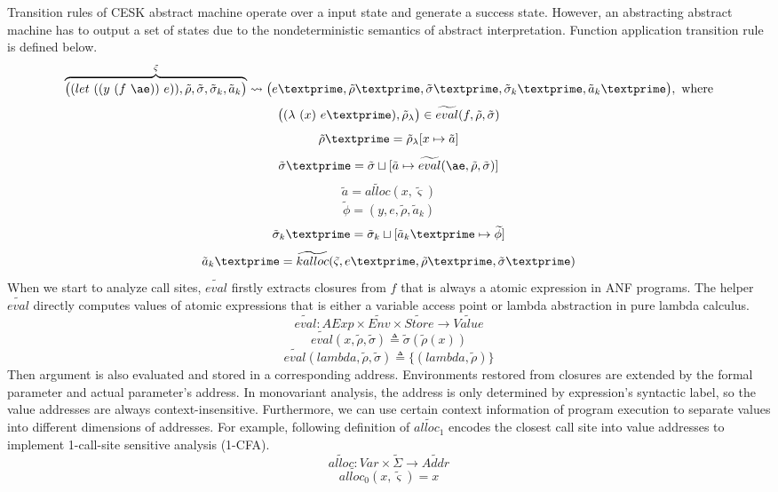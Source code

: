 \documentclass{article}
\begin{document}
Transition rules of CESK abstract machine operate over a input state and generate a success state.
However, an abstracting abstract machine has to output a set of states due to the nondeterministic semantics of abstract interpretation.
Function application transition rule is defined below.
\[
\overbrace{
\big((let\ ((y\ (f\ \ae))\ e)), \tilde{\rho}, \tilde{\sigma}, \tilde{\sigma}_k, \tilde{a}_k \big)
}^{\tilde{\varsigma}}
\leadsto \big(e\textprime,\tilde{\rho}\textprime, \tilde{\sigma}\textprime, \tilde{\sigma}_k\textprime, \tilde{a}_k\textprime \big), \mbox{ where}
\]
\[
\big((\lambda\ (x)\ e\textprime), \tilde{\rho}_{\lambda}  \big) \in \widetilde{eval}(f, \tilde{\rho}, \tilde{\sigma})
\]
\[
\tilde{\rho}\textprime = \tilde{\rho}_{\lambda}[x \mapsto \tilde{a}]
\]
\[
\tilde{\sigma}\textprime = \tilde{\sigma} \sqcup [\tilde{a} \mapsto \widetilde{eval}(\ae, \tilde{\rho}, \tilde{\sigma})]
\]
\[
\tilde{a} = \widetilde{alloc}(x, \tilde{\varsigma})
\]
\[
\widetilde{\phi} = {(y, e, \tilde{\rho}, \tilde{a}_k)}
\]
\[
\tilde{\sigma}_k\textprime = \tilde{\sigma}_k \sqcup [\tilde{a}_k\textprime \mapsto \widetilde{\phi}]
\]
\[
\tilde{a}_k\textprime = \widetilde{kalloc}(\tilde{\varsigma}, e\textprime, \tilde{\rho}\textprime, \tilde{\sigma}\textprime)
\]
When we start to analyze call sites, $\widetilde{eval}$ firstly extracts closures from $f$ that is always a atomic expression in ANF programs.
The helper $\widetilde{eval}$ directly computes values of atomic expressions that is either a variable access point or lambda abstraction in pure lambda calculus.
\[
\widetilde{eval} : AExp \times \widetilde{Env} \times \widetilde{Store} \to \widetilde{Value}
\]
\[
\widetilde{eval}(x, \tilde{\rho}, \tilde{\sigma}) \triangleq \tilde{\sigma}(\tilde{\rho}(x))
\]
\[
\widetilde{eval}(lambda, \tilde{\rho}, \tilde{\sigma}) \triangleq \{(lambda, \tilde{\rho})\}
\]
Then argument is also evaluated and stored in a corresponding address.
Environments restored from closures are extended by the formal parameter and actual parameter's address.
In monovariant analysis, the address is only determined by expression's syntactic label, so the value addresses are always context-insensitive. Furthermore, we can use certain context information of program execution to separate values into different dimensions of addresses.
For example, following definition of $\widetilde{alloc_1}$ encodes the closest call site into value addresses to implement 1-call-site sensitive analysis (1-CFA).
\[
\widetilde{alloc} : Var \times \tilde{\Sigma} \to \widetilde{Addr}
\]
\[
\widetilde{alloc_0} (x, \tilde{\varsigma}) = x
\]
\end{document}
